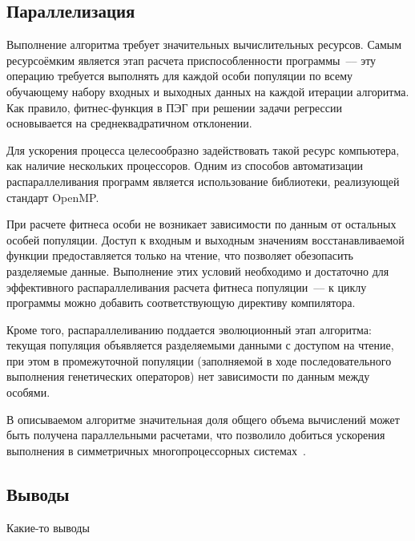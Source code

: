 


\subsection{Параллелизация}

Выполнение алгоритма требует значительных вычислительных ресурсов. Самым ресурсоёмким является этап расчета приспособленности программы~--– эту операцию требуется выполнять для каждой особи популяции по всему обучающему набору входных и выходных данных на каждой итерации алгоритма. Как правило, фитнес-функция в ПЭГ при решении задачи регрессии основывается на среднеквадратичном отклонении.

Для ускорения процесса целесообразно задействовать такой ресурс компьютера, как наличие нескольких процессоров. Одним из способов автоматизации распараллеливания программ является использование библиотеки, реализующей стандарт OpenMP.

При расчете фитнеса особи не возникает зависимости по данным от остальных особей популяции. Доступ к входным и выходным значениям восстанавливаемой функции предоставляется только на чтение, что позволяет обезопасить разделяемые данные. Выполнение этих условий необходимо и достаточно для эффективного распараллеливания расчета фитнеса популяции~--– к циклу программы можно добавить соответствующую директиву компилятора.

Кроме того, распараллеливанию поддается эволюционный этап алгоритма: текущая популяция объявляется разделяемыми данными с доступом на чтение, при этом в промежуточной популяции (заполняемой в ходе последовательного выполнения генетических операторов) нет зависимости по данным между особями.

В описываемом алгоритме значительная доля общего объема вычислений может быть получена параллельными расчетами, что позволило добиться ускорения выполнения в симметричных многопроцессорных системах~\cite{SergMir_05_2013_sevas}.





\subsection{Выводы}

Какие-то выводы
